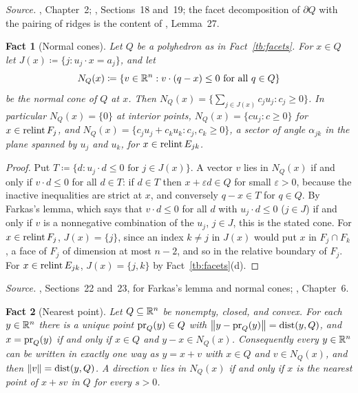\documentclass[11pt,letterpaper]{article}
\theoremstyle{plain}
\newtheorem{fact}{Fact}[section]
\begin{document}
\emph{Source.} , Chapter~2; , Sections~18 and~19;
the facet decomposition of \(\partial Q\) with the pairing of ridges is
the content of , Lemma~27.

\begin{fact}[Normal cones]\label{tb:normalcone}
Let \(Q\) be a polyhedron as in Fact~\ref{tb:facets}. For \(x\in Q\) let
\(J(x)\coloneqq \{j:u_j\cdot x=a_j\}\), and let
\[
 N_Q(x)\coloneqq \{v\in\mathbb R^n:v\cdot(q-x)\le0\text{ for all }q\in Q\}
\]
be the \emph{normal cone} of \(Q\) at \(x\). Then
\(N_Q(x)=\{\sum_{j\in J(x)}c_ju_j:c_j\ge0\}\). In particular
\(N_Q(x)=\{0\}\) at interior points, \(N_Q(x)=\{cu_j:c\ge0\}\) for
\(x\in\operatorname{relint} F_j\), and \(N_Q(x)=\{c_ju_j+c_ku_k:c_j,c_k\ge0\}\), a sector of
angle \(\alpha_{jk}\) in the plane spanned by \(u_j\) and \(u_k\), for
\(x\in\operatorname{relint} E_{jk}\).
\end{fact}

\begin{proof}
Put \(T\coloneqq \{d:u_j\cdot d\le0\text{ for }j\in J(x)\}\). A vector \(v\) lies in
\(N_Q(x)\) if and only if \(v\cdot d\le0\) for all \(d\in T\): if \(d\in T\)
then \(x+\varepsilon d\in Q\) for small \(\varepsilon>0\), because the
inactive inequalities are strict at \(x\), and conversely \(q-x\in T\) for
\(q\in Q\). By Farkas's lemma, which says that \(v\cdot d\le0\) for all
\(d\) with \(u_j\cdot d\le0\) (\(j\in J\)) if and only if \(v\) is a
nonnegative combination of the \(u_j\), \(j\in J\), this is the stated
cone. For \(x\in\operatorname{relint} F_j\), \(J(x)=\{j\}\), since an index \(k\ne j\) in
\(J(x)\) would put \(x\) in \(F_j\cap F_k\), a face of \(F_j\) of dimension
at most \(n-2\), and so in the relative boundary of \(F_j\). For
\(x\in\operatorname{relint} E_{jk}\), \(J(x)=\{j,k\}\) by Fact~\ref{tb:facets}(d).
\end{proof}

\emph{Source.} , Sections~22 and~23, for Farkas's lemma and normal
cones; , Chapter~6.

\begin{fact}[Nearest point]\label{tb:projection}
Let \(Q\subseteq\mathbb R^n\) be nonempty, closed, and convex. For each
\(y\in\mathbb R^n\) there is a unique point \(\operatorname{pr}_Q(y)\in Q\) with
\(\left\lVert y-\operatorname{pr}_Q(y)\right\rVert=\operatorname{dist}(y,Q)\), and \(x=\operatorname{pr}_Q(y)\) if and only if
\(x\in Q\) and \(y-x\in N_Q(x)\). Consequently every \(y\in\mathbb R^n\) can be
written in exactly one way as \(y=x+v\) with \(x\in Q\) and \(v\in N_Q(x)\),
and then \(\left\lVert v\right\rVert=\operatorname{dist}(y,Q)\). A direction \(v\) lies in \(N_Q(x)\) if and
only if \(x\) is the nearest point of \(x+s v\) in \(Q\) for every \(s>0\).
\end{fact}
\end{document}
